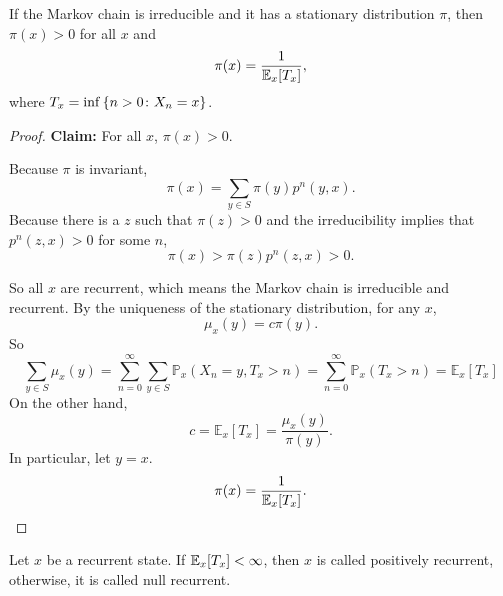 \begin{thm}
    If the Markov chain is irreducible and it has a stationary distribution $\pi$, then $\pi(x) > 0$ for all $x$ and
    \begin{equation*}
        \pi(x) = \frac{1}{\mathbb{E}_x[T_x]},
    \end{equation*}
    where $T_x = \inf \left\{n > 0 \colon X_n = x\right\}$.
\end{thm}
\begin{proof}
    \noindent \textbf{Claim:} For all $x$, $\pi(x) > 0$.

    Because $\pi$ is invariant,
    \begin{equation*}
        \pi(x) = \sum_{y \in S} \pi(y) p^n(y, x).
    \end{equation*}
    Because there is a $z$ such that $\pi(z) > 0$ and the irreducibility implies that $p^n(z,x) > 0$ for some $n$,
    \begin{equation*}
        \pi(x) > \pi(z)p^n(z,x) > 0.
    \end{equation*}

    \noindent So all $x$ are recurrent, which means the Markov chain is irreducible and recurrent. By the uniqueness of the stationary distribution, for any $x$,
    \begin{equation*}
        \mu_x(y)=c \pi(y).
    \end{equation*}
    So
    \begin{equation*}
        \sum_{y \in S} \mu_x(y)=\sum_{n=0}^{\infty} \sum_{y \in S} \mathbb{P}_x\left(X_n=y, T_x>n\right)=\sum_{n=0}^{\infty} \mathbb{P}_x\left(T_x>n\right)=\mathbb{E}_x\left[T_x\right]
    \end{equation*}
    On the other hand,
    \begin{equation*}
        c = \mathbb{E}_x\left[T_x\right] = \frac{\mu_x(y)}{\pi(y)}.
    \end{equation*}
    In particular, let $y = x$.
    \begin{equation*}
        \pi(x) = \frac{1}{\mathbb{E}_x[T_x]}. \qedhere
    \end{equation*}
\end{proof}

\begin{defn}
    Let $x$ be a recurrent state. If $\mathbb{E}_x[T_x] < \infty$, then $x$ is called positively recurrent, otherwise, it is called null recurrent.
\end{defn}

